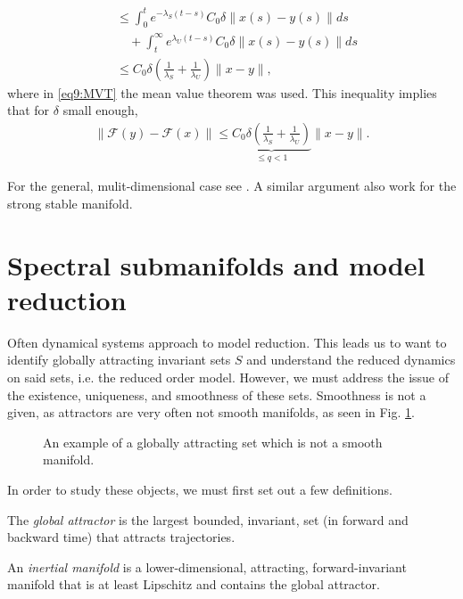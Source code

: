 \begin{enumerate}
\begin{align}
					    &\leq \int_{0}^{t} e^{-\lambda _{S}(t-s)}C_0 \delta \| x(s) - y(s)\| ds \\
					    &\quad + \int_{t}^{\infty } e^{\lambda _{U}(t-s)}C_0 \delta \|x(s) - y(s)\| ds \label{eq9:MVT}\\
					    &\leq C_0 \delta \left(\frac{1}{\lambda _{S}} + \frac{1}{\lambda _{U}} \right) \| x - y\|,
\end{align}
where in \eqref{eq9:MVT} the mean value theorem was used. This inequality implies that for $\delta$ small enough,
\begin{align}
	\|\mathcal{F}(y) - \mathcal{F}(x) \| \leq \underbrace{C_0 \delta \left( \frac{1}{\lambda_S} + \frac{1}{\lambda _{U}}\right) }_{\leq q < 1} \| x - y\|.
\end{align}
\end{enumerate}
For the general, mulit-dimensional case see \cite{Chicone}. A similar argument also work for the strong stable manifold.

\section{Spectral submanifolds and model reduction}
Often dynamical systems approach to model reduction. This leads us to want to identify globally attracting invariant sets $S$ and understand the reduced dynamics on said sets, i.e. the reduced order model. However, we must address the issue of the existence, uniqueness, and smoothness of these sets. Smoothness is not a given, as attractors are very often not smooth manifolds, as seen in Fig. \ref{fig:nonsmooth_set}.
\begin{figure}[h!]
	\centering
	\caption{An example of a globally attracting set which is not a smooth manifold.}
	\label{fig:nonsmooth_set}
\end{figure}

In order to study these objects, we must first set out a few definitions.
\begin{definition}
	The \emph{global attractor} is the largest bounded, invariant, set (in forward and backward time) that attracts trajectories.
\end{definition}
\begin{definition}
An \emph{inertial manifold} is a lower-dimensional, attracting, forward-invariant manifold that is at least Lipschitz and contains the global attractor.
\end{definition}

